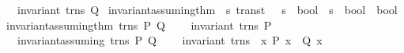 \begin{isabellebody}
\ \ invariant\ trns\ Q{\isacharparenright}\isanewline
{\isachardoublequoteclose}\isanewline
\isanewline
{}\isamarkupfalse%
\ invariant{\isacharunderscore}assuming{\isacharunderscore}thm\ {\isacharcolon}{\isacharcolon}\ {\isachardoublequoteopen}{\isacharprime}s\ trans{\isacharunderscore}t\ {\isasymRightarrow}\ \ {\isacharparenleft}{\isacharprime}s\ {\isasymRightarrow}\ bool{\isacharparenright}\ {\isasymRightarrow}\ {\isacharparenleft}{\isacharprime}s\ {\isasymRightarrow}\ bool{\isacharparenright}\ {\isasymRightarrow}\ bool{\isachardoublequoteclose}\ \isanewline
{\isachardoublequoteopen}invariant{\isacharunderscore}assuming{\isacharunderscore}thm\ trns\ P\ Q\ {\isacharequal}\ {\isacharparenleft}\isanewline
\ \ invariant\ trns\ P\ {\isacharampersand}\isanewline
\ \ invariant{\isacharunderscore}assuming\ trns\ P\ Q\ \isanewline
\ \ {\isasymlongrightarrow}\ invariant\ trns\ {\isacharparenleft}{\isacharpercent}\ x{\isachardot}\ P\ x\ {\isacharampersand}\ Q\ x{\isacharparenright}\isanewline
{\isacharparenright}{\isachardoublequoteclose}\isanewline
\isanewline
\isanewline
\isanewline
%
\isadelimtheory
\isanewline
%
\endisadelimtheory
%
\isatagtheory
{}\isamarkupfalse%
%
\endisatagtheory
{\isafoldtheory}%
%
\isadelimtheory
%
\endisadelimtheory
\end{isabellebody}%
